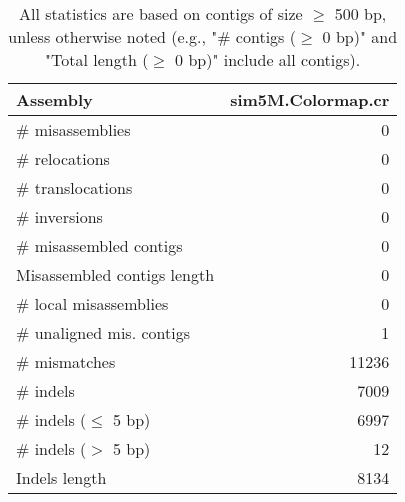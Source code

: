 \documentclass[12pt,a4paper]{article}
\begin{document}
\begin{table}[ht]
\begin{center}
\caption{All statistics are based on contigs of size $\geq$ 500 bp, unless otherwise noted (e.g., "\# contigs ($\geq$ 0 bp)" and "Total length ($\geq$ 0 bp)" include all contigs).}
\begin{tabular}{|l*{1}{|r}|}
\hline
Assembly & sim5M.Colormap.cr \\ \hline
\# misassemblies & 0 \\ \hline
\hspace{5mm}\# relocations & 0 \\ \hline
\hspace{5mm}\# translocations & 0 \\ \hline
\hspace{5mm}\# inversions & 0 \\ \hline
\# misassembled contigs & 0 \\ \hline
Misassembled contigs length & 0 \\ \hline
\# local misassemblies & 0 \\ \hline
\# unaligned mis. contigs & 1 \\ \hline
\# mismatches & 11236 \\ \hline
\# indels & 7009 \\ \hline
\hspace{5mm}\# indels ($\leq$ 5 bp) & 6997 \\ \hline
\hspace{5mm}\# indels ($>$ 5 bp) & 12 \\ \hline
Indels length & 8134 \\ \hline
\end{tabular}
\end{center}
\end{table}
\end{document}
